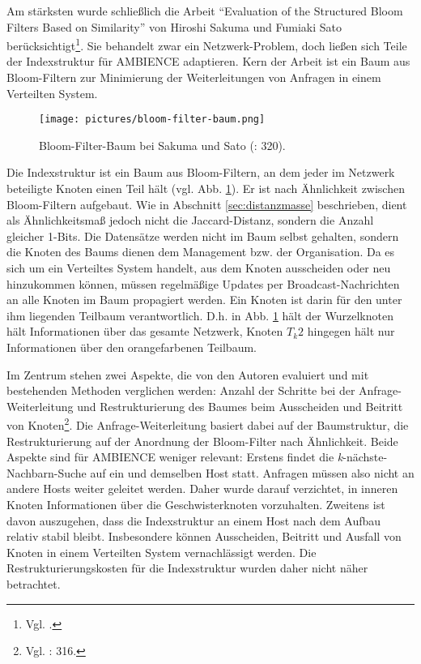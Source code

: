 Am stärksten wurde schließlich die Arbeit "`Evaluation of the Structured Bloom Filters Based on Similarity"' von Hiroshi Sakuma und Fumiaki Sato berücksichtigt\footnote{Vgl. \cite{Sakuma2011}.}. Sie behandelt zwar ein Netzwerk-Problem, doch ließen sich Teile der Indexstruktur für AMBIENCE adaptieren. Kern der Arbeit ist ein Baum aus Bloom-Filtern zur Minimierung der Weiterleitungen von Anfragen in einem Verteilten System. 
\begin{figure}[hpbt]
  \centering
  \texttt{[image: pictures/bloom-filter-baum.png]}\\
  \caption[Bloom-Filter-Baum bei Sakuma und Sato (Bildnachweis: \cite{Sakuma2011}: 320)]{Bloom-Filter-Baum bei Sakuma und Sato (\cite{Sakuma2011}: 320).}\label{fig:pic5}
\end{figure}
Die Indexstruktur ist ein Baum aus Bloom-Filtern, an dem jeder im Netzwerk beteiligte Knoten einen Teil hält (vgl. Abb. \ref{fig:pic5}). Er ist nach Ähnlichkeit zwischen Bloom-Filtern aufgebaut. Wie in Abschnitt \ref{sec:distanzmasse} beschrieben, dient als Ähnlichkeitsmaß jedoch nicht die Jaccard-Distanz, sondern die Anzahl gleicher 1-Bits. Die Datensätze werden nicht im Baum selbst gehalten, sondern die Knoten des Baums dienen dem Management bzw. der Organisation. Da es sich um ein Verteiltes System handelt, aus dem Knoten ausscheiden oder neu hinzukommen können, müssen regelmäßige Updates per Broadcast-Nachrichten an alle Knoten im Baum propagiert werden. Ein Knoten ist darin für den unter ihm liegenden Teilbaum verantwortlich. D.h. in Abb. \ref{fig:pic5} hält der Wurzelknoten hält Informationen über das gesamte Netzwerk, Knoten $T_k2$ hingegen hält nur Informationen über den orangefarbenen Teilbaum. 

Im Zentrum stehen zwei Aspekte, die von den Autoren evaluiert und mit bestehenden Methoden verglichen werden: Anzahl der Schritte bei der Anfrage-Weiterleitung und Restrukturierung des Baumes beim Ausscheiden und Beitritt von Knoten\footnote{Vgl. \cite{Sakuma2011}: 316.}. Die Anfrage-Weiterleitung basiert dabei auf der Baumstruktur, die Restrukturierung auf der Anordnung der Bloom-Filter nach Ähnlichkeit. Beide Aspekte sind für AMBIENCE weniger relevant: Erstens findet die \textit{k}-nächste-Nachbarn-Suche auf ein und demselben Host statt. Anfragen müssen also nicht an andere Hosts weiter geleitet werden. Daher wurde darauf verzichtet, in inneren Knoten Informationen über die Geschwisterknoten vorzuhalten. Zweitens ist davon auszugehen, dass die Indexstruktur an einem Host nach dem Aufbau relativ stabil bleibt. Insbesondere können Ausscheiden, Beitritt und Ausfall von Knoten in einem Verteilten System vernachlässigt werden. Die Restrukturierungskosten für die Indexstruktur wurden daher nicht näher betrachtet.  

